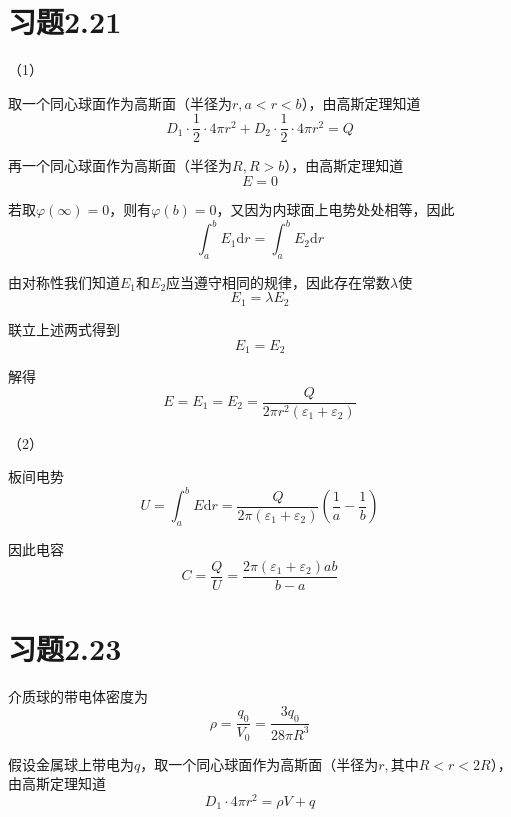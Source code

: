 \documentclass{SCIS2020cn}
\begin{document}
\section{习题2.21}
（1）

取一个同心球面作为高斯面（半径为$r,a<r<b$），由高斯定理知道
\begin{equation}
    D_1·\frac{1}{2}·4\pi{}r^2+D_2·\frac{1}{2}·4\pi{}r^2=Q
\end{equation}

再一个同心球面作为高斯面（半径为$R,R>b$），由高斯定理知道
\begin{equation}
    E=0
\end{equation}

若取$\varphi(\infty)=0$，则有$\varphi(b)=0$，又因为内球面上电势处处相等，因此
\begin{equation}
    \int_a^bE_1\text{d}r=\int_a^bE_2\text{d}r
\end{equation}

由对称性我们知道$E_1$和$E_2$应当遵守相同的规律，因此存在常数$\lambda$使
\begin{equation}
    E_1=\lambda{}E_2
\end{equation}

联立上述两式得到
\begin{equation}
    E_1=E_2
\end{equation}

解得
\begin{equation}
    E=E_1=E_2=\frac{Q}{2\pi{}r^2(\varepsilon_1+\varepsilon_2)}
\end{equation}

（2）

板间电势
\begin{equation}
    U=\int_a^bE\text{d}r=\frac{Q}{2\pi{}(\varepsilon_1+\varepsilon_2)}\left(\frac{1}{a}-\frac{1}{b}\right)
\end{equation}

因此电容
\begin{equation}
    C=\frac{Q}{U}=\frac{2\pi{}(\varepsilon_1+\varepsilon_2)ab}{b-a}
\end{equation}

\section{习题2.23}
介质球的带电体密度为
\begin{equation}
    \rho=\frac{q_0}{V_0}=\frac{3q_0}{28\pi{}R^3}
\end{equation}

假设金属球上带电为$q$，取一个同心球面作为高斯面（半径为$r,\text{其中}R<r<2R$），由高斯定理知道
\begin{equation}
    D_1·4\pi{}r^2=\rho{}V+q
\end{equation}
\end{document}
